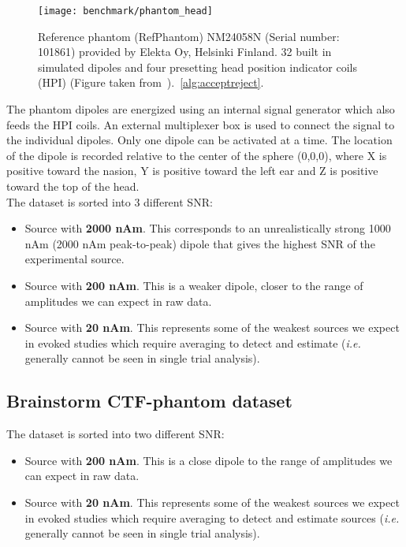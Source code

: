 \begin{figure}[tb]
   \centering
\texttt{[image: benchmark/phantom\_head]}
\caption{Reference phantom (RefPhantom) NM24058N (Serial number: 101861) provided by Elekta Oy, Helsinki Finland. 32 built in simulated dipoles and four presetting head position indicator coils (HPI) (Figure taken from~\cite{hazim2015magnetoencephalography}).~\ref{alg:acceptreject}.}
   \label{fig:phantom_head}
\end{figure}

The phantom dipoles are energized using an internal signal generator which also feeds the HPI coils. An external multiplexer box is used to connect the signal to the individual dipoles. Only one dipole can be activated at a time. The location of the dipole is recorded relative to the center of the sphere (0,0,0), where X is positive toward the nasion, Y is positive toward the left ear and Z is positive toward the top of the head.\\

The dataset is sorted into 3 different \ac{SNR}:
\begin{itemize}
\item Source with \textbf{2000 nAm}. This corresponds to an unrealistically strong 1000 nAm (2000 nAm peak-to-peak) dipole that gives the highest SNR of the experimental source.
\item Source with \textbf{200 nAm}. This is a weaker dipole, closer to the range of amplitudes we can expect in raw data.
\item Source with \textbf{20 nAm}. This represents some of the weakest sources we expect in evoked studies which require averaging to detect and estimate (\textit{i.e.} generally cannot be seen in single trial analysis).
\end{itemize}

\subsection{Brainstorm CTF-phantom dataset}

The dataset is sorted into two different SNR:
\begin{itemize}
\item Source with \textbf{200 nAm}. This is a close dipole to the range of amplitudes we can expect in raw data.
\item Source with \textbf{20 nAm}. This represents some of the weakest sources we expect in evoked studies which require averaging to detect and estimate sources (\textit{i.e.} generally cannot be seen in single trial analysis).
\end{itemize}


